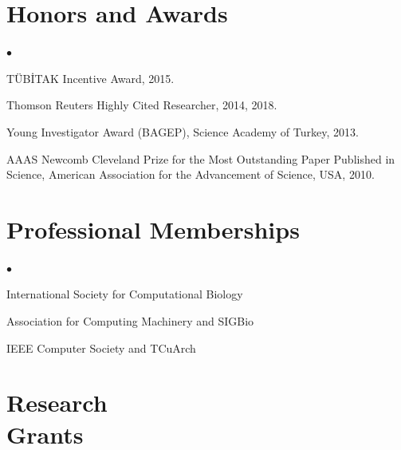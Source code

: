 \documentclass[margin,line]{res}
\newenvironment{list2}{
  \begin{list}{$\bullet$}{%
      \setlength{\itemsep}{0.1cm}
      \setlength{\parsep}{0in} \setlength{\parskip}{0in}
      \setlength{\topsep}{0in} \setlength{\partopsep}{0in} 
      \setlength{\leftmargin}{0.2in}}}{\end{list}}
\newenvironment{list4}{
  \begin{list}{$\bullet$}{%
      \setlength{\itemsep}{0cm}
      \setlength{\parsep}{0in} \setlength{\parskip}{0in}
      \setlength{\topsep}{0in} \setlength{\partopsep}{0in} 
      \setlength{\leftmargin}{0.2in}}}{\end{list}}
\newcommand{\junk}[1]{}
\begin{document}
\begin{resume}
          \clearpage
          
          \vspace*{-.2cm}
          \section{\sc Honors and Awards} 
          \begin{list4}
          \item
            TÜBİTAK Incentive Award, 2015.
          \item
            Thomson Reuters Highly Cited Researcher, 2014, 2018.
          \item
            Young Investigator Award (BAGEP), Science Academy of Turkey, 2013.
          \item
            AAAS Newcomb Cleveland Prize for the Most Outstanding Paper Published in Science, American Association for the Advancement of Science, USA, 2010.
          \end{list4}
          

\vspace*{-.2cm}
\section{\sc Professional Memberships}
\begin{list4}
\item 
  International Society for Computational Biology%
\item
  Association for Computing Machinery and SIGBio
\item
  IEEE Computer Society and TCuArch
\end{list4}


          \section{\sc Research \\ Grants}
\junk{
                                       \vspace{-0.4cm}
                                       \subsection{\small \sc ~~~~Active}


                                                      \begin{list2}


                                       \end{list2}
}


\end{resume}
\end{document}
